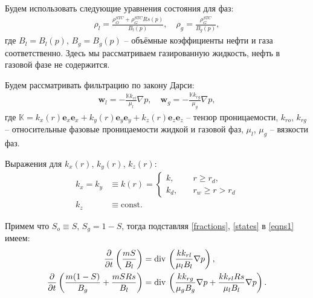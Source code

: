 	Будем использовать следующие уравнения состояния для фаз:
\begin{align}
	\label{states}
	\rho_{l} = \frac{\rho_O^{STC} + \rho_G^{STC}Rs(p)}{B_l(p)}, \quad \rho_{g} = \frac{\rho_G^{STC}}{B_g(p)},
\end{align}
	где $B_l = B_l(p)$, $B_g = B_g(p)$  -- объёмные коэффициенты нефти и газа соответственно.
	Здесь мы рассматриваем газированную жидкость, нефть в газовой фазе не содержится.
	
	Будем рассматривать фильтрацию по закону Дарси:
\begin{align}
	\label{vel}
	\boldsymbol{w}_l = -\frac{\mathbb{K}k_{rl}}{\mu_l}\nabla p, \quad
	\boldsymbol{w}_g = -\frac{\mathbb{K}k_{rg}}{\mu_g}\nabla p, 
\end{align}
	где $\mathbb{K} = k_x(r)\boldsymbol{e}_x\boldsymbol{e}_x + k_y(r)\boldsymbol{e}_y\boldsymbol{e}_y+ k_z(r)\boldsymbol{e}_z\boldsymbol{e}_z$ -- тензор проницаемости,
	$k_{ro}$, $k_{rg}$ -- относительные фазовые проницаемости жидкой и газовой фаз,
	$\mu_l$, $\mu_g$ -- вязкости фаз.
	
	Выражения для $k_x(r)$, $k_y(r)$, $k_z(r)$:
\begin{align}
	\label{perms}
	k_x = k_y &\equiv k(r) = 
	\begin{cases}
		k, &\quad r\geq r_d,\\
		k_d, &\quad r_w\geq r > r_d
	\end{cases}\\
	k_z &\equiv \text{const}.
\end{align}

	Примем что $S_o \equiv S$, $S_g = 1 - S$, тогда подставляя \eqref{fractions}, \eqref{states} в \eqref{eqns1} имеем:
\begin{align}
	\label{eqns2}
	\frac{\partial}{\partial{t}}\left(\frac{mS}{B_l}\right)&=
	{\rm div}\,\left(\frac{kk_{rl}}{\mu_l B_l}\nabla p\right),\\
	\frac{\partial}{\partial{t}}\left(\frac{m(1-S)}{B_g}+\frac{mSRs}{B_l}\right)&=
	{\rm div}\,\left(\frac{kk_{rg}}{\mu_g B_g}\nabla p+\frac{kk_{rl}Rs}{\mu_l B_l}\nabla p\right).
\end{align}
	
	

	 
